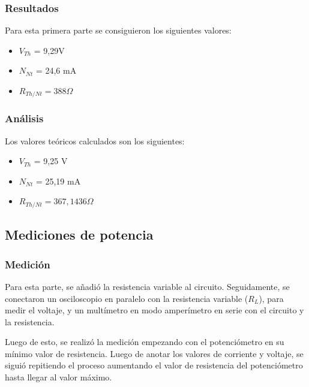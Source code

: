 \documentclass{article}
\begin{document}
            \subsubsection{Resultados}

                \quad Para esta primera parte se consiguieron los siguientes valores:
            	\begin{itemize}
                \item $V_{Th}$ = 9,29V
                \item $N_{Nt}$ = 24,6 mA
                \item $R_{Th/Nt} = 388  \Omega $
                \end{itemize}

            \subsubsection{Análisis}
            \quad Los valores teóricos calculados son los siguientes:
            	\begin{itemize}
                \item $V_{Th}$ = 9,25 V
                \item $N_{Nt}$ = 25,19 mA
                \item $R_{Th/Nt} = 367,1436  \Omega $
                \end{itemize}
        
        \subsection{Mediciones de potencia}

            \subsubsection{Medición}

            \quad Para esta parte, se añadió la resistencia variable al circuito. Seguidamente, se conectaron un osciloscopio en paralelo con la resistencia variable ($R_{L}$), para medir el voltaje, y un multímetro en modo amperímetro en serie con el circuito y la resistencia.\par
            Luego de esto, se realizó la medición empezando con el potenciómetro en su mínimo valor de resistencia. Luego de anotar los valores de corriente y voltaje, se siguió repitiendo el proceso aumentando el valor de resistencia del potenciómetro hasta llegar al valor máximo.\par
            
\end{document}
